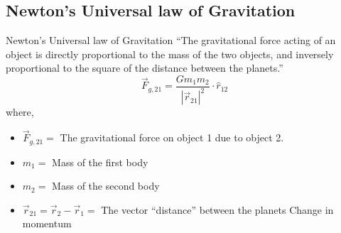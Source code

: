 





\subsection{Newton's Universal law of Gravitation}
\begin{frame}{Newton's Universal law of Gravitation}
	``The gravitational force acting of an object is directly proportional
    to the mass of the two objects, and inversely proportional to the square
    of the distance between the planets.''
	\begin{equation}
	\vec{F}_{g,21} = \frac{Gm_1m_2}{|\vec{r}_{21}|^2}\cdot \hat{r}_{12}
	\end{equation}
	where,
	\begin{itemize}
	\item \(\vec{F}_{g,21} = \) The gravitational force on object 1 due to 
    object 2.
    \item \(m_1 = \) Mass of the first body
    \item \(m_2 = \) Mass of the second body
	\item \(\vec{r}_{21} = \vec{r}_2 - \vec{r}_1 = \) The vector ``distance'' between the planets
		Change in momentum
	\end{itemize}
\end{frame}